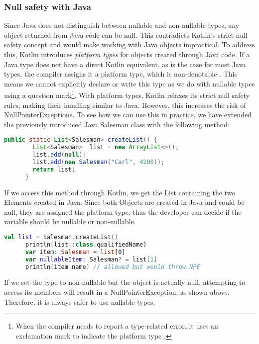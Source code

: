 \documentclass[a4paper, 11pt]{article}
\begin{document}
  \subsubsection{Null safety with Java}
    Since Java does not distinguish between nullable and non-nullable types, any object returned from Java code can be null. This contradicts Kotlin's strict null safety concept and would make working with Java objects impractical.
    To address this, Kotlin introduces \textit{platform types} for objects created through Java code. If a Java type does not have a direct Kotlin equivalent, as is the case for most Java types, the compiler assigns it a platform type, which is non-denotable \cite{interop-null-safety}. This means we cannot explicitly declare or write this type as we do with nullable types using a question mark\footnote{When the compiler needs to report a type-related error, it uses an exclamation mark to indicate the platform type \cite{interop-platform-notation}.}. With platform types, Kotlin relaxes its strict null safety rules, making their handling similar to Java. However, this increases the risk of NullPointerExceptions.
    To see how we can use this in practice, we have extended the previously introduced Java Salesman class with the following method:
    \begin{lstlisting}[language=Java]
      public static List<Salesman> createList() {
        List<Salesman>  list = new ArrayList<>();
        list.add(null);
        list.add(new Salesman("Carl", 4200));
        return list;
      }
    \end{lstlisting}
    If we access this method through Kotlin, we get the List containing the two Elements created in Java. Since both Objects are created in Java and could be null, they are assigned the platform type, thus the developer can decide if the variable should be nullable or non-nullable.
    \begin{lstlisting}[language=Kotlin]  
      val list = Salesman.createList()
      println(list::class.qualifiedName)
      var item: Salesman = list[0]
      var nullableItem: Salesman? = list[1]
      println(item.name) // allowed but would throw NPE
    \end{lstlisting}
    If we set the type to non-nullable but the object is actually null, attempting to access its members will result in a NullPointerException, as shown above. Therefore, it is always safer to use nullable types.
\end{document}
